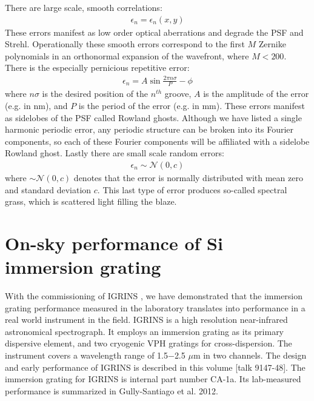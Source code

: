 \documentclass[]{spie}  %
\begin{document}
There are large scale, smooth correlations:
\begin{eqnarray}
\epsilon_n = \epsilon_n(x, y) \label{eqn:smooth}
\end{eqnarray}
These errors manifest as low order optical aberrations and degrade the PSF and Strehl.  Operationally these smooth errors correspond to the first $M$ Zernike polynomials in an orthonormal expansion of the wavefront, where $M < 200$.  There is the especially pernicious repetitive error:
\begin{eqnarray}
\epsilon_n = A\sin{\frac{2\pi n\sigma}{P} - \phi} \label{eqn:Periodic}
\end{eqnarray}
where $n\sigma$ is the desired position of the $n^{th}$ groove, $A$ is the amplitude of the error (e.g. in nm), and $P$ is the period of the error (e.g. in mm).  These errors manifest as sidelobes of the PSF called Rowland ghosts.  Although we have listed a single harmonic periodic error, any periodic structure can be broken into its Fourier components, so each of these Fourier components will be affiliated with a sidelobe Rowland ghost.  Lastly there are small scale random errors:
\begin{eqnarray}
\epsilon_n \sim \mathcal{N}(0, c)
\end{eqnarray}
where $ \sim \mathcal{N}(0, c)$ denotes that the error is normally distributed with mean zero and standard deviation $c$.  This last type of error produces so-called spectral grass\cite{2007ApOpt..46.3400M}, which is scattered light filling the blaze.

\section{On-sky performance of Si immersion grating}

With the commissioning of IGRINS \cite{2010SPIE.7735E..54Y}, we have demonstrated that the immersion grating performance measured in the laboratory translates into performance in a real world instrument in the field.  IGRINS is a high resolution near-infrared astronomical spectrograph.  It employs an immersion grating as its primary dispersive element, and two cryogenic VPH gratings for cross-dispersion.  The instrument covers a wavelength range of 1.5$-$2.5 $\mu$m in two channels.  The design and early performance of IGRINS is described in this volume [talk 9147-48]\cite{2014SPIE.CHANPARK.IGRINS}.  The immersion grating for IGRINS is internal part number CA-1a.  Its lab-measured performance is summarized in Gully-Santiago et al. 2012\cite{2012SPIE.8450E..2SG}.
\end{document}

